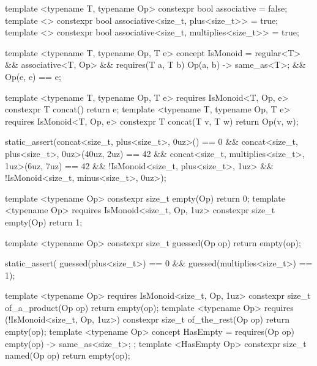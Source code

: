 \begin{listing}[htbp]
\begin{cpp}
template <typename T, typename Op>
constexpr bool associative = false;
template <> constexpr bool associative<size_t, plus<size_t>> = true;
template <> constexpr bool associative<size_t, multiplies<size_t>> = true;

template <typename T, typename Op, T e>
concept IsMonoid = regular<T> && associative<T, Op> &&
    requires(T a, T b) { { Op{}(a, b) } -> same_as<T>; } &&
    Op{}(e, e) == e;

template <typename T, typename Op, T e> requires IsMonoid<T, Op, e>
constexpr T concat() { return e; }
template <typename T, typename Op, T e> requires IsMonoid<T, Op, e>
constexpr T concat(T v, T w) { return Op{}(v, w); }

static_assert(concat<size_t, plus<size_t>, 0uz>() == 0 &&
              concat<size_t, plus<size_t>, 0uz>(40uz, 2uz) == 42 &&
              concat<size_t, multiplies<size_t>, 1uz>(6uz, 7uz) == 42 &&
              !IsMonoid<size_t, plus<size_t>, 1uz> &&
              !IsMonoid<size_t, minus<size_t>, 0uz>);
\end{cpp}
\vspace{-6pt}
\begin{minipage}[t]{0.48\linewidth}
\begin{cpp}
template <typename Op>
constexpr size_t empty(Op) { return 0; }
template <typename Op>
  requires IsMonoid<size_t, Op, 1uz>
constexpr size_t empty(Op) { return 1; }

template <typename Op>
constexpr size_t guessed(Op op)
  { return empty(op); }

static_assert(
guessed(plus<size_t>{}) == 0 &&
guessed(multiplies<size_t>{}) == 1);
\end{cpp}
\end{minipage}\hfill
\begin{minipage}[t]{0.48\linewidth}
\begin{cpp}
template <typename Op>
  requires IsMonoid<size_t, Op, 1uz>
constexpr size_t of_a_product(Op op)
  { return empty(op); }
template <typename Op>
  requires (!IsMonoid<size_t, Op, 1uz>)
constexpr size_t of_the_rest(Op op)
  { return empty(op); }
template <typename Op>
concept HasEmpty = requires(Op op) {
  { empty(op) } -> same_as<size_t>; };
template <HasEmpty Op>
constexpr size_t named(Op op)
  { return empty(op); }
\end{cpp}
\end{minipage}
\caption{\hyperref[def:rule2]{Rule~2}: Abstraction.
Top: a monoid as a carrier, an operation and its unit: the law as a trait, the shape, the function , and what the shape refuses.
Bottom left:  makes a call that \Cpp{} accepts, while Rule~2 and the linter refuse it.
Bottom right: the style Jlt requires: a function's constraints name the shape, its negation, or the call itself.}
\label{lst:rule2}
\label{lst:undecided}
\end{listing}

